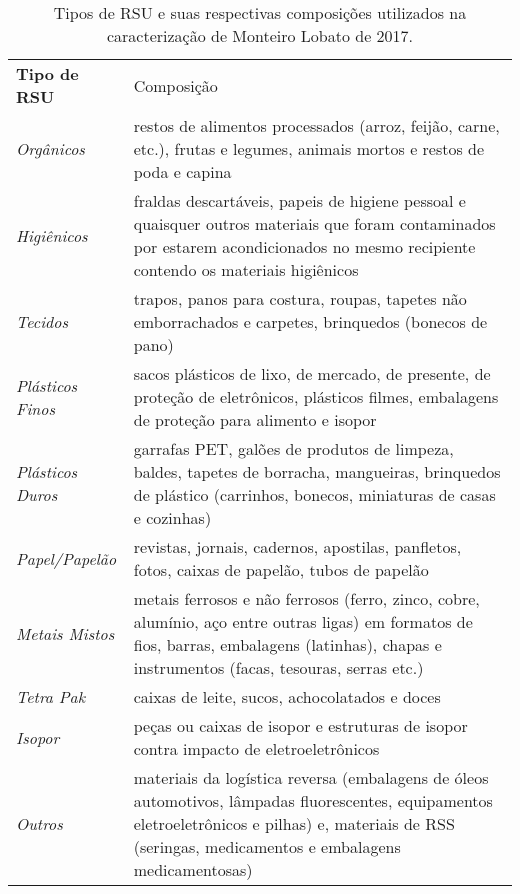 \begin{table}[htbp]
  \centering
  \caption{Tipos de RSU e suas respectivas composições utilizados na caracterização de Monteiro Lobato de 2017.}
    \begin{tabular}{p{9.93em}|p{22.715em}}
    \rowcolor[rgb]{ .969,  .588,  .275} \textcolor[rgb]{ 1,  1,  1}{\textbf{Tipo de RSU}} & \textcolor[rgb]{ 1,  1,  1}{Composição  } \\
    \rowcolor[rgb]{ .992,  .914,  .851} \textit{Orgânicos} & restos de alimentos processados (arroz, feijão, carne, etc.), frutas e legumes, animais mortos e restos de poda e capina \\
    \rowcolor[rgb]{ .984,  .831,  .706} \textit{Higiênicos} & fraldas descartáveis, papeis de higiene pessoal e quaisquer outros materiais que foram contaminados por estarem acondicionados no mesmo recipiente contendo os materiais higiênicos \\
    \rowcolor[rgb]{ .992,  .914,  .851} \textit{Tecidos} & trapos, panos para costura, roupas, tapetes não emborrachados e carpetes, brinquedos (bonecos de pano) \\
    \rowcolor[rgb]{ .984,  .831,  .706} \textit{Plásticos Finos} & sacos plásticos de lixo, de mercado, de presente, de proteção de eletrônicos, plásticos filmes, embalagens de proteção para alimento e isopor \\
    \rowcolor[rgb]{ .992,  .914,  .851} \textit{Plásticos Duros} & garrafas PET, galões de produtos de limpeza, baldes, tapetes de borracha, mangueiras, brinquedos de plástico (carrinhos, bonecos, miniaturas de casas e cozinhas) \\
    \rowcolor[rgb]{ .984,  .831,  .706} \textit{Papel/Papelão} & revistas, jornais, cadernos, apostilas, panfletos, fotos, caixas de papelão, tubos de papelão \\
    \rowcolor[rgb]{ .992,  .914,  .851} \textit{Metais Mistos} & metais ferrosos e não ferrosos (ferro, zinco, cobre, alumínio, aço entre outras ligas) em formatos de fios, barras, embalagens (latinhas), chapas e instrumentos (facas, tesouras, serras etc.) \\
    \rowcolor[rgb]{ .984,  .831,  .706} \textit{Tetra Pak} & caixas de leite, sucos, achocolatados e doces \\
    \rowcolor[rgb]{ .992,  .914,  .851} \textit{Isopor} & peças ou caixas de isopor e estruturas de isopor contra impacto de eletroeletrônicos \\
    \rowcolor[rgb]{ .984,  .831,  .706} \textit{Outros} & materiais da logística reversa (embalagens de óleos automotivos, lâmpadas fluorescentes, equipamentos eletroeletrônicos e pilhas) e, materiais de RSS (seringas, medicamentos e embalagens medicamentosas) \\
    \end{tabular}%
  \label{tab:tipo_rsu_ml}%
\end{table}%
